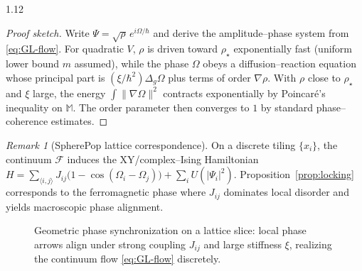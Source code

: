 \documentclass[12pt,a4paper]{article}
\numberwithin{equation}{section}
\theoremstyle{remark}
\newtheorem{remark}{Remark}[section]
\theoremstyle{definition}
\begin{document}
\begin{spacing}{1.12}
\begin{proof}[Proof sketch]
Write $\Psi=\sqrt{\rho}\,e^{i\Omega/\hbar}$ and derive the amplitude–phase system from \eqref{eq:GL-flow}.
For quadratic $V$, $\rho$ is driven toward $\rho_\star$ exponentially fast (uniform lower bound $m$ assumed), while the phase $\Omega$ obeys a diffusion–reaction equation whose principal part is $(\xi/\hbar^2)\Delta_g\Omega$ plus terms of order $\nabla\rho$.
With $\rho$ close to $\rho_\star$ and $\xi$ large, the energy $\int\|\nabla\Omega\|^2$ contracts exponentially by Poincaré’s inequality on $\mathbb{M}$. The order parameter then converges to $1$ by standard phase–coherence estimates.
\end{proof}

\begin{remark}[SpherePop lattice correspondence]
On a discrete tiling $\{x_i\}$, the continuum $\mathcal{F}$ induces the XY/complex–Ising Hamiltonian $H=\sum_{\langle i,j\rangle} J_{ij}\big(1-\cos(\Omega_i-\Omega_j)\big)+\sum_i U(|\Psi_i|^2)$.
Proposition~\ref{prop:locking} corresponds to the ferromagnetic phase where $J_{ij}$ dominates local disorder and yields macroscopic phase alignment.
\end{remark}

\begin{figure}[t]
\centering
{}
\caption{Geometric phase synchronization on a lattice slice: local phase arrows align under strong coupling $J_{ij}$ and large stiffness $\xi$, realizing the continuum flow \eqref{eq:GL-flow} discretely.}
\label{fig:phase-lattice}
\end{figure}


\end{spacing}
\end{document}
